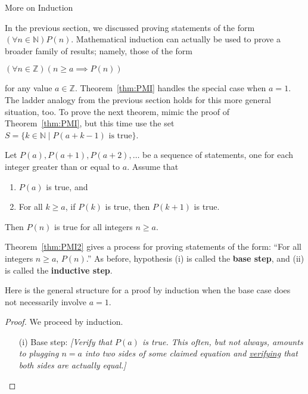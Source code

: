 \begin{section}{More on Induction}\label{sec:More_on_Induction}

In the previous section, we discussed proving statements of the form $(\forall n \in \mathbb{N}) P(n)$. Mathematical induction can actually be used to prove a broader family of results; namely, those of the form
\begin{center}
$(\forall n \in \mathbb{Z})(n \geq a \implies P(n))$
\end{center}
for any value $a \in \mathbb{Z}$. Theorem~\ref{thm:PMI} handles the special case when $a = 1$.  The ladder analogy from the previous section holds for this more general situation, too. To prove the next theorem, mimic the proof of Theorem~\ref{thm:PMI}, but this time use the set $S=\{k\in \mathbb{N}\mid P(a+k-1) \text{ is true}\}$.

\begin{theorem}\label{thm:PMI2}
Let $P(a), P(a+1), P(a+2), \ldots$ be a sequence of statements, one for each integer greater than or equal to $a$. Assume that
\begin{enumerate}[label=\textrm{(\roman*)}]
\item $P(a)$ is true, and
\item For all $k\geq a$, if $P(k)$ is true, then $P(k+1)$ is true.
\end{enumerate}
Then $P(n)$ is true for all integers $n \geq a$.
\end{theorem}

Theorem~\ref{thm:PMI2} gives a process for proving statements of the form: ``For all integers $n\geq a$, $P(n)$.'' As before, hypothesis (i) is called the \textbf{base step}, and (ii) is called the \textbf{inductive step}.

\begin{skeleton}
Here is the general structure for a proof by induction when the base case does not necessarily involve $a=1$.

\begin{mdframed}[style=skeleton]
\begin{proof}
We proceed by induction.
\begin{enumerate}\setlength{\itemsep}{0in}
\item[(i)] Base step: \emph{[Verify that $P(a)$ is true. This often, but not always, amounts to plugging $n=a$ into two sides of some claimed equation and \underline{verifying} that both sides are actually equal.]}


\end{enumerate}
\end{proof}
\end{mdframed}
\end{skeleton}
\end{section}
